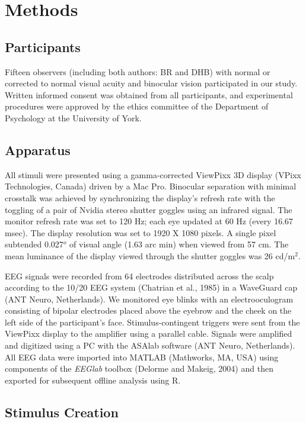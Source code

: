 \documentclass[
  12pt,
]{article}
\begin{document}
\section{Methods}\label{methods}

\subsection{Participants}\label{participants}

Fifteen observers (including both authors: BR and DHB) with normal or
corrected to normal visual acuity and binocular vision participated in
our study. Written informed consent was obtained from all participants,
and experimental procedures were approved by the ethics committee of the
Department of Psychology at the University of York.

\subsection{Apparatus}\label{apparatus}

All stimuli were presented using a gamma-corrected ViewPixx 3D display
(VPixx Technologies, Canada) driven by a Mac Pro. Binocular separation
with minimal crosstalk was achieved by synchronizing the display's
refresh rate with the toggling of a pair of Nvidia stereo shutter
goggles using an infrared signal. The monitor refresh rate was set to
120 Hz; each eye updated at 60 Hz (every 16.67 msec). The display
resolution was set to 1920 X 1080 pixels. A single pixel subtended
0.027\(^o\) of visual angle (1.63 arc min) when viewed from 57 cm. The
mean luminance of the display viewed through the shutter goggles was 26
cd/m\(^2\).

EEG signals were recorded from 64 electrodes distributed across the
scalp according to the 10/20 EEG system (Chatrian et al., 1985) in a
WaveGuard cap (ANT Neuro, Netherlands). We monitored eye blinks with an
electrooculogram consisting of bipolar electrodes placed above the
eyebrow and the cheek on the left side of the participant's face.
Stimulus-contingent triggers were sent from the ViewPixx display to the
amplifier using a parallel cable. Signals were amplified and digitized
using a PC with the ASAlab software (ANT Neuro, Netherlands). All EEG
data were imported into MATLAB (Mathworks, MA, USA) using components of
the \textit{EEGlab} toolbox (Delorme and Makeig, 2004) and then exported
for subsequent offline analysis using R.

\subsection{Stimulus Creation}\label{stimulus-creation}
\end{document}
